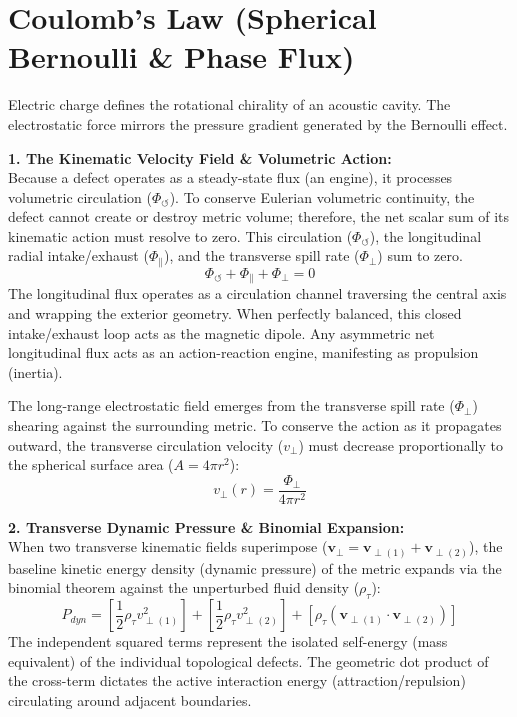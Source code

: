 \section{Coulomb's Law (Spherical Bernoulli \& Phase Flux)}
\label{sec:deriv_coulomb_bernoulli}

Electric charge defines the rotational chirality of an acoustic cavity. The electrostatic force mirrors the pressure gradient generated by the Bernoulli effect.

\vspace{0.2 cm}

\textbf{1. The Kinematic Velocity Field \& Volumetric Action:} \\
Because a defect operates as a steady-state flux (an engine), it processes volumetric circulation ($\Phi_{\circlearrowleft}$). To conserve Eulerian volumetric continuity, the defect cannot create or destroy metric volume; therefore, the net scalar sum of its kinematic action must resolve to zero. This circulation ($\Phi_{\circlearrowleft}$), the longitudinal radial intake/exhaust ($\Phi_{\parallel}$), and the transverse spill rate ($\Phi_{\perp}$) sum to zero.
\begin{equation}
    \Phi_{\circlearrowleft} + \Phi_{\parallel} + \Phi_{\perp} = 0 \label{eq:flux_decomposition}
\end{equation}
The longitudinal flux operates as a circulation channel traversing the central axis and wrapping the exterior geometry. When perfectly balanced, this closed intake/exhaust loop acts as the magnetic dipole. Any asymmetric net longitudinal flux acts as an action-reaction engine, manifesting as propulsion (inertia). 

The long-range electrostatic field emerges from the transverse spill rate ($\Phi_{\perp}$) shearing against the surrounding metric. To conserve the action as it propagates outward, the transverse circulation velocity ($v_\perp$) must decrease proportionally to the spherical surface area ($A = 4\pi r^2$): 
\begin{equation}
    v_{\perp}(r) = \frac{\Phi_{\perp}}{4\pi r^2} \label{eq:transverse_velocity_dilution}
\end{equation}

\textbf{2. Transverse Dynamic Pressure \& Binomial Expansion:} \\
When two transverse kinematic fields superimpose ($\mathbf{v}_{\perp} = \mathbf{v}_{\perp(1)} + \mathbf{v}_{\perp(2)}$), the baseline kinetic energy density (dynamic pressure) of the metric expands via the binomial theorem against the unperturbed fluid density ($\rho_{\tau}$):
\begin{equation}
    P_{dyn} = \left[ \frac{1}{2}\rho_{\tau} v_{\perp(1)}^2 \right] + \left[ \frac{1}{2}\rho_{\tau} v_{\perp(2)}^2 \right] + \left[ \rho_{\tau} (\mathbf{v}_{\perp(1)} \cdot \mathbf{v}_{\perp(2)}) \right]
\end{equation}
The independent squared terms represent the isolated self-energy (mass equivalent) of the individual topological defects. The geometric dot product of the cross-term dictates the active interaction energy (attraction/repulsion) circulating around adjacent boundaries.

